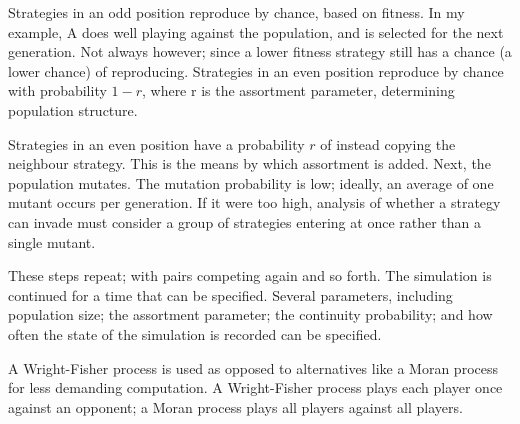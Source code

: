 \documentclass[a4paper,11pt,bcshonoursthesis,singlespace,twoside,thesisdraft,pdflatex]{cssethesis}
\begin{document}
Strategies in an odd position reproduce by chance, based on fitness. 
In my example, A does well playing against the population, and is selected for the next generation. 
Not always however; since a lower fitness strategy still has a chance (a lower chance) of reproducing. 
Strategies in an even position reproduce by chance with probability $1-r$, where r is the assortment parameter, determining population structure. 

Strategies in an even position have a probability $r$ of instead copying the neighbour strategy. 
This is the means by which assortment is added. 
Next, the population mutates. 
The mutation probability is low; ideally, an average of one mutant occurs per generation. 
If it were too high, analysis of whether a strategy can invade must consider a group of strategies entering at once rather than a single mutant. 

These steps repeat; with pairs competing again and so forth. 
The simulation is continued for a time that can be specified. 
Several parameters, including population size; the assortment parameter; the continuity probability; and how often the state of the simulation is recorded can be specified. 

A Wright-Fisher process is used as opposed to alternatives like a Moran process for less demanding computation. A Wright-Fisher process plays each player once against an opponent; a Moran process plays all players against all players. 
\end{document}
